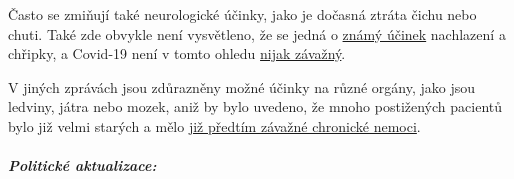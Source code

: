 Často se zmiňují také neurologické účinky, jako je dočasná ztráta čichu
nebo chuti. Také zde obvykle není vysvětleno, že se jedná o
\href{https://www.ncbi.nlm.nih.gov/pubmed/25294743}{známý účinek}
nachlazení a chřipky, a Covid-19 není v tomto ohledu
\href{https://www.ncbi.nlm.nih.gov/pubmed/23948436}{nijak závažný}.

V jiných zprávách jsou zdůrazněny možné účinky na různé orgány, jako
jsou ledviny, játra nebo mozek, aniž by bylo uvedeno, že mnoho
postižených pacientů bylo již velmi starých a mělo
\href{https://www.epicentro.iss.it/coronavirus/sars-cov-2-decessi-italia}{již
předtím závažné chronické nemoci}.

\hypertarget{politickuxe9-aktualizace-1}{%
\subparagraph{\texorpdfstring{\textbf{Politické
aktualizace:}}{Politické aktualizace:}}\label{politickuxe9-aktualizace-1}}

